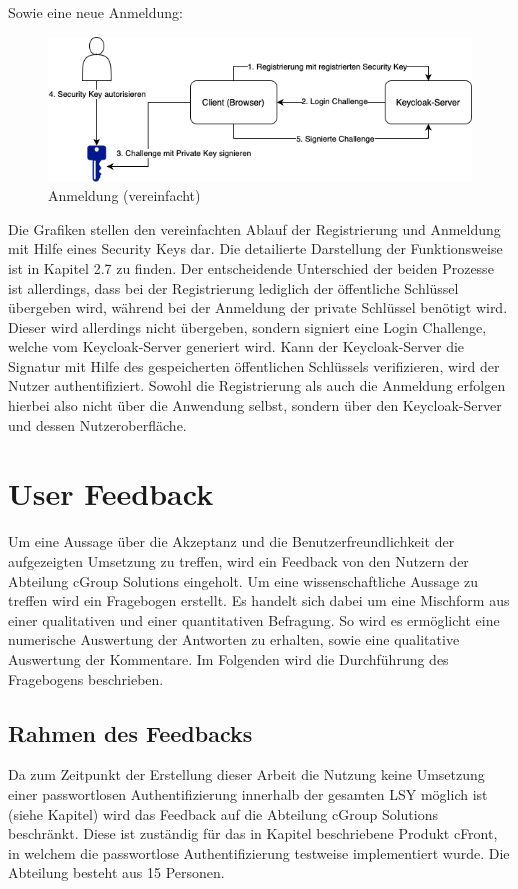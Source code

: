 Sowie eine neue Anmeldung:

\begin{figure}[H]
	\centering 
	\includegraphics[width=1\textwidth]{img/abbildungen/login_simplified.png}
	\captionsetup{format=hang}
	\caption{Anmeldung (vereinfacht)}
\end{figure}

Die Grafiken stellen den vereinfachten Ablauf der Registrierung und Anmeldung mit Hilfe eines Security Keys dar. Die detailierte Darstellung der Funktionsweise ist in Kapitel 2.7 zu finden. Der entscheidende Unterschied der beiden Prozesse ist allerdings, dass bei der Registrierung lediglich der öffentliche Schlüssel übergeben wird, während bei der Anmeldung der private Schlüssel benötigt wird. Dieser wird allerdings nicht übergeben, sondern signiert eine Login Challenge, welche vom Keycloak-Server generiert wird. Kann der Keycloak-Server die Signatur mit Hilfe des gespeicherten öffentlichen Schlüssels verifizieren, wird der Nutzer authentifiziert. Sowohl die Registrierung als auch die Anmeldung erfolgen hierbei also nicht über die Anwendung selbst, sondern über den Keycloak-Server und dessen Nutzeroberfläche.

\section{User Feedback}
Um eine Aussage über die Akzeptanz und die Benutzerfreundlichkeit der aufgezeigten Umsetzung zu treffen, wird ein Feedback von den Nutzern der Abteilung cGroup Solutions eingeholt. Um eine wissenschaftliche Aussage zu treffen wird ein Fragebogen erstellt. Es handelt sich dabei um eine Mischform aus einer qualitativen und einer quantitativen Befragung. So wird es ermöglicht eine numerische Auswertung der Antworten zu erhalten, sowie eine qualitative Auswertung der Kommentare. Im Folgenden wird die Durchführung des Fragebogens beschrieben.

\subsection{Rahmen des Feedbacks}
Da zum Zeitpunkt der Erstellung dieser Arbeit die Nutzung keine Umsetzung einer passwortlosen Authentifizierung innerhalb der gesamten \ac{LSY} möglich ist (siehe Kapitel) wird das Feedback auf die Abteilung cGroup Solutions beschränkt. Diese ist zuständig für das in Kapitel beschriebene Produkt cFront, in welchem die passwortlose Authentifizierung testweise implementiert wurde. Die Abteilung besteht aus 15 Personen.

